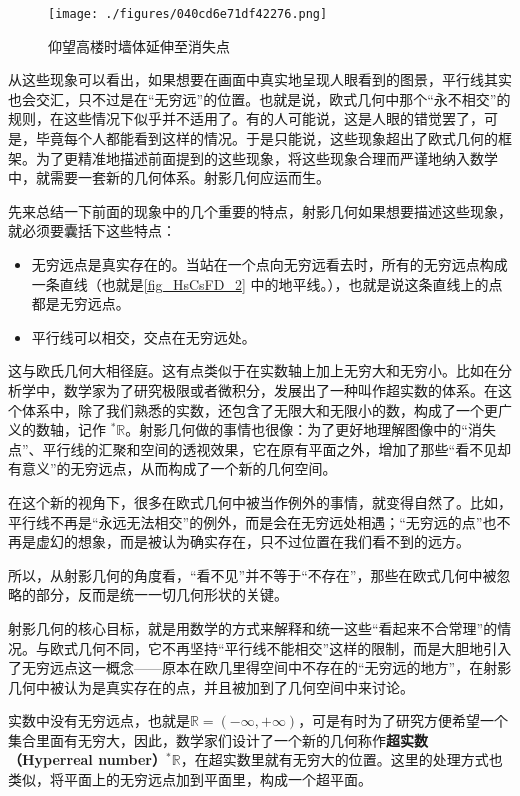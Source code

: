 \begin{figure}[ht]
\centering
\texttt{[image: ./figures/040cd6e71df42276.png]}
\caption{仰望高楼时墙体延伸至消失点} \label{fig_HsCsFD_3}
\end{figure}

从这些现象可以看出，如果想要在画面中真实地呈现人眼看到的图景，平行线其实也会交汇，只不过是在“无穷远”的位置。也就是说，欧式几何中那个“永不相交”的规则，在这些情况下似乎并不适用了。有的人可能说，这是人眼的错觉罢了，可是，毕竟每个人都能看到这样的情况。于是只能说，这些现象超出了欧式几何的框架。为了更精准地描述前面提到的这些现象，将这些现象合理而严谨地纳入数学中，就需要一套新的几何体系。射影几何应运而生。

先来总结一下前面的现象中的几个重要的特点，射影几何如果想要描述这些现象，就必须要囊括下这些特点：
\begin{itemize}
\item 无穷远点是真实存在的。当站在一个点向无穷远看去时，所有的无穷远点构成一条直线（也就是\autoref{fig_HsCsFD_2} 中的地平线。），也就是说这条直线上的点都是无穷远点。
\item 平行线可以相交，交点在无穷远处。
\end{itemize}

这与欧氏几何大相径庭。这有点类似于在实数轴上加上无穷大和无穷小。比如在分析学中，数学家为了研究极限或者微积分，发展出了一种叫作超实数的体系。在这个体系中，除了我们熟悉的实数，还包含了无限大和无限小的数，构成了一个更广义的数轴，记作 $^*\mathbb{R}$。射影几何做的事情也很像：为了更好地理解图像中的“消失点”、平行线的汇聚和空间的透视效果，它在原有平面之外，增加了那些“看不见却有意义”的无穷远点，从而构成了一个新的几何空间。


在这个新的视角下，很多在欧式几何中被当作例外的事情，就变得自然了。比如，平行线不再是“永远无法相交”的例外，而是会在无穷远处相遇；“无穷远的点”也不再是虚幻的想象，而是被认为确实存在，只不过位置在我们看不到的远方。

所以，从射影几何的角度看，“看不见”并不等于“不存在”，那些在欧式几何中被忽略的部分，反而是统一一切几何形状的关键。

射影几何的核心目标，就是用数学的方式来解释和统一这些“看起来不合常理”的情况。与欧式几何不同，它不再坚持“平行线不能相交”这样的限制，而是大胆地引入了无穷远点这一概念——原本在欧几里得空间中不存在的“无穷远的地方”，在射影几何中被认为是真实存在的点，并且被加到了几何空间中来讨论。




实数中没有无穷远点，也就是$\mathbb{R}=(-\infty,+\infty)$，可是有时为了研究方便希望一个集合里面有无穷大，因此，数学家们设计了一个新的几何称作\textbf{超实数（Hyperreal number）}$^*\mathbb{R}$，在超实数里就有无穷大的位置。这里的处理方式也类似，将平面上的无穷远点加到平面里，构成一个超平面。

